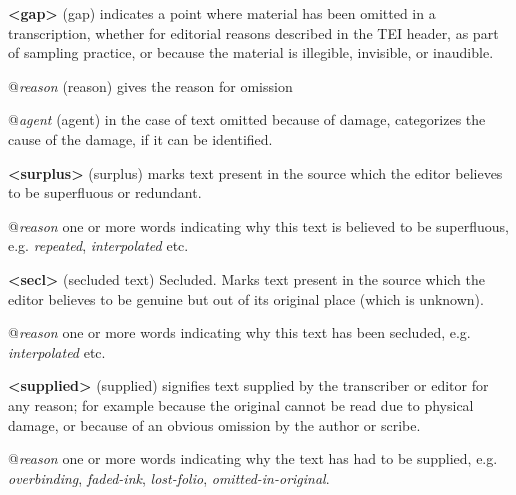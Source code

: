 \begin{sansreflist}
  
\item [\textbf{<gap>}] (gap) indicates a point where material has been omitted in a transcription, whether for editorial reasons described in the TEI header, as part of sampling practice, or because the material is illegible, invisible, or inaudible.\hfil\\[-10pt]\begin{sansreflist}
    \item[@{\itshape reason}]
  (reason) gives the reason for omission
    \item[@{\itshape agent}]
  (agent) in the case of text omitted because of damage, categorizes the cause of the damage, if it can be identified.
\end{sansreflist}  
\item [\textbf{<surplus>}] (surplus) marks text present in the source which the editor believes to be superfluous or redundant.\hfil\\[-10pt]\begin{sansreflist}
    \item[@{\itshape reason}]
  one or more words indicating why this text is believed to be superfluous, e.g. \textit{repeated}, \textit{interpolated} etc.
\end{sansreflist}  
\item [\textbf{<secl>}] (secluded text) Secluded. Marks text present in the source which the editor believes to be genuine but out of its original place (which is unknown).\hfil\\[-10pt]\begin{sansreflist}
    \item[@{\itshape reason}]
  one or more words indicating why this text has been secluded, e.g. \textit{interpolated} etc.
\end{sansreflist}  
\item [\textbf{<supplied>}] (supplied) signifies text supplied by the transcriber or editor for any reason; for example because the original cannot be read due to physical damage, or because of an obvious omission by the author or scribe.\hfil\\[-10pt]\begin{sansreflist}
    \item[@{\itshape reason}]
  one or more words indicating why the text has had to be supplied, e.g. \textit{overbinding}, \textit{faded-ink}, \textit{lost-folio}, \textit{omitted-in-original}.
\end{sansreflist}  
\end{sansreflist}
